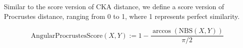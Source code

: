 \documentclass{article} %
\begin{document}
Similar to the score version of CKA distance, we define a score version of Procrustes distance, ranging from 0 to 1, where 1 represents perfect similarity.

$$\text{AngularProcrustesScore}(X, Y):= 1 - \dfrac{\arccos (\text{NBS}(X, Y))}{\pi / 2}$$












\end{document}
